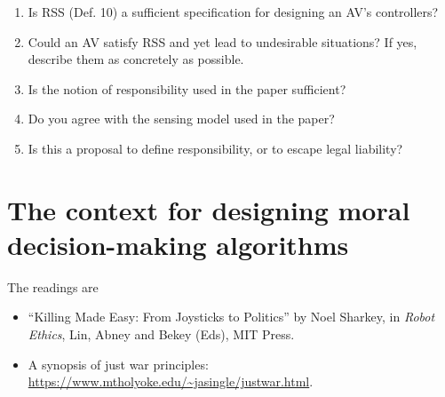 \documentclass[letta4 paper]{article}
\numberwithin{equation}{section}
\newcommand{\0}{\mathbf{0}}
\begin{document}
\begin{enumerate}
		\item Is RSS (Def. 10) a sufficient specification for designing an AV's controllers? 
		
		\item Could an AV satisfy RSS and yet lead to undesirable situations? If yes, describe them as concretely as possible.
		
		\item Is the notion of responsibility used in the paper sufficient? 
		
		\item Do you agree with the sensing model used in the paper? 
		
		\item Is this a proposal to define responsibility, or to escape legal liability?
	\end{enumerate}
	
	\section{The context for designing moral decision-making algorithms}
	\label{sec:context}
	
	The readings are
	\begin{itemize}
		\item ``Killing Made Easy: From Joysticks to Politics'' by Noel Sharkey, in \textit{Robot Ethics}, Lin, Abney and Bekey (Eds), MIT Press.
		\item A synopsis of just war principles: \url{https://www.mtholyoke.edu/~jasingle/justwar.html}.
	\end{itemize}
	
\end{document}
